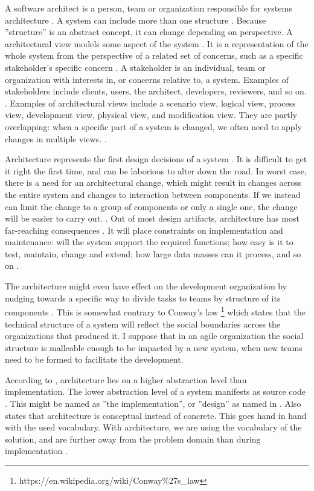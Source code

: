 \documentclass[utf8,english]{gradu3}
\begin{document}
A software architect is a person, team or organization responsible for systems architecture \parencite[3]{IEEE42010}.
A system can include more than one structure \parencite[23]{Bass1998}. Because
''structure'' is an abstract concept, it can change depending on perspective. A
architectural view models some aspect of the system
\parencite{Koskimies2005}. It is a representation of the whole system from the
perspective of a related set of concerns, such as a specific stakeholder's
specific concern \parencite[3]{IEEE42010}. A stakeholder is an
individual, team or organization with interests in, or concerns relative to, a
system. Examples of stakeholders include clients, users, the architect, developers, reviewers,
and so on. \parencite[3]{IEEE42010}. Examples of architectural views include a
scenario view, logical view, process view, development view, physical view, and
modification view. They are partly overlapping: when a specific part of a system
is changed, we often need to apply changes in multiple views.
\parencite{Koskimies2005}.

Architecture represents the first design decisions of a system
\parencite{Bass1998}. It is difficult to get it right the first time, and can be
laborious to alter down the road. In worst case, there is a need for an
architectural change, which might result in changes across the entire system and
changes to interaction between components. If we instead can limit the change to
a group of components or only a single one, the change will be easier to carry
out. \parencite[31]{Bass1998}. Out of most design artifacts, architecture has most far-reaching consequences
\parencite[31]{Bass1998}. It will place constraints on implementation and
maintenance: will the system support the required functions; how easy is it to
test, maintain, change and extend; how large data masses can it process, and so
on \parencite{Koskimies2005}.

The architecture might even have effect on the development organization by
nudging towards a specific way to divide tasks to teams by structure of its
components \parencite[31]{Bass1998}. This is somewhat contrary to Conway's law
\footnote{https://en.wikipedia.org/wiki/Conway\%27s\_law} which states that the
technical structure of a system will reflect the social boundaries across the
organizations that produced it. I suppose that in an agile organization the
social structure is malleable enough to be impacted by a new system, when new
teams need to be formed to facilitate the development.

According to \textcite{Koskimies2005}, architecture lies on a higher abstraction
level than implementation. The lower abstraction level of a system manifests as
source code \parencite[24]{Bass1998}. This might be named as ''the
implementation'', or ''design'' as named in \textcite{IEEE12207}. Also
\textcite[4]{IEEE42010} states that architecture is conceptual instead of
concrete. This goes hand in hand with the used vocabulary. With architecture, we
are using the vocabulary of the solution, and are further away from the problem
domain than during implementation \parencite{Koskimies2005}.
\end{document}

